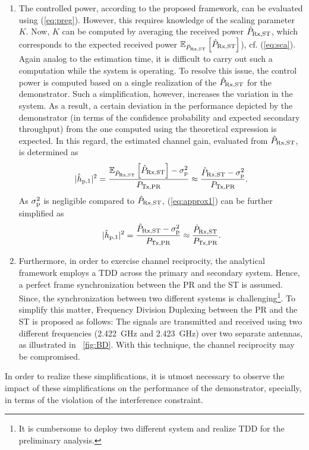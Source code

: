 \begin{enumerate}
	\item The controlled power, according to the proposed framework, can be evaluated using (\ref{eq:preg}). However, this requires knowledge of the scaling parameter $K$. Now, $K$ can be computed by averaging the received power $\hat{P}_{\text{Rx,ST}}$, which corresponds to the expected received power ${\mathbb E}_{\hat{P}_{\text{Rx,ST}}}\left[ \hat{P}_{\text{Rx,ST}} \right]$), cf. (\ref{eq:sca}). Again analog to the estimation time, it is difficult to carry out such a computation while the system is operating. To resolve this issue, the control power is computed based on a single realization of the $\hat{P}_{\text{Rx,ST}}$ for the demonstrator. Such a simplification, however, increases the variation in the system. As a result, a certain deviation in the performance depicted by the demonstrator (in terms of the confidence probability and expected secondary throughput) from the one computed using the theoretical expression is expected. 
In this regard, the estimated channel gain, evaluated from $\hat{P}_{\text{Rx,ST}}$, is determined as 
	\begin{equation}
		|\hat{h}_{\text{p,1}}|^2 = \frac{{\mathbb E}_{\hat{P}_{\text{Rx,ST}}}\left[ \hat{P}_{\text{Rx,ST}} \right]-\sigma^2_{\text{p}}}{P_{\text{Tx,PR}}} \approx \frac{\hat{P}_{\text{Rx,ST}}-\sigma^2_{\text{p}}}{P_{\text{Tx,PR}}}. 
		\label{eq:approx1}
	\end{equation}	
As $\sigma^2_{\text{p}}$ is negligible compared to $\hat{P}_{\text{Rx,ST}}$, (\ref{eq:approx1}) can be further simplified as 
	\begin{equation}
		|\hat{h}_{\text{p,1}}|^2 = \frac{\hat{P}_{\text{Rx,ST}}-\sigma^2_{\text{p}}}{P_{\text{Tx,PR}}} \approx \frac{\hat{P}_{\text{Rx,ST}}}{P_{\text{Tx,PR}}}.
		\label{eq:approx2}
	\end{equation}	
	\item Furthermore, in order to exercise channel reciprocity, the analytical framework employs a TDD across the primary and secondary system. Hence, a perfect frame synchronization between the PR and the ST is assumed. Since, the synchronization between two different systems is challenging\footnote{It is cumbersome to deploy two different system and realize TDD for the preliminary analysis.}. To simplify this matter, Frequency Division Duplexing between the PR and the ST is proposed as follows: The signals are transmitted and received using two different frequencies (\SI{2.422}{GHz} and \SI{2.423}{GHz}) over two separate antennas, as illustrated in \figurename~\ref{fig:BD}. With this technique, the channel reciprocity may be compromised.	
\end{enumerate}
In order to realize these simplifications, it is utmost necessary to observe the impact of these simplifications on the performance of the demonstrator, specially, in terms of the violation of the interference constraint.

